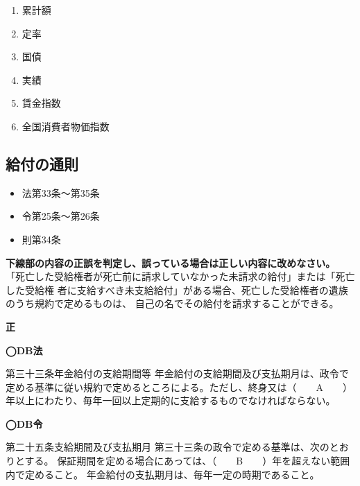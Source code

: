 \begin{answerbox}
  \begin{enumerate}[A:]
    \item 累計額
    \item 定率
    \item 国債
    \item 実績
    \item 賃金指数
    \item 全国消費者物価指数
  \end{enumerate}
\end{answerbox}

\newpage

\subsection{給付の通則}

\begin{InyouJobunbox}
  \begin{itemize}
    \item 法第33条〜第35条
    \item 令第25条〜第26条
    \item 則第34条
  \end{itemize}
\end{InyouJobunbox}

\begin{truefalse}[年金1 H28 問題2(1)\textcircled{3}]
    \textbf{下線部の内容の正誤を判定し、誤っている場合は正しい内容に改めなさい。}
  \\

   「死亡した受給権者が死亡前に請求していなかった未請求の給付」または「死亡した受給権
者に支給すべき未支給給付」がある場合、死亡した受給権者の遺族のうち規約で定めるものは、
自己の名でその給付を請求することができる。
\end{truefalse}

\begin{answerbox}
  \textbf{正}
\end{answerbox}

\begin{fillblank}[自作 2026/10/12]
  \noindent \textbf{◯DB法}
  \begin{lawstructure}
    \begin{lawarticle}{第三十三条}{年金給付の支給期間等}
      年金給付の支給期間及び支払期月は、政令で定める基準に従い規約で定めるところによる。ただし、終身又は（　　A　　）年以上にわたり、毎年一回以上定期的に支給するものでなければならない。
    \end{lawarticle}
  \end{lawstructure}

  \noindent \textbf{◯DB令}
  \begin{lawstructure}
    \begin{lawarticle}{第二十五条}{支給期間及び支払期月}
      第三十三条の政令で定める基準は、次のとおりとする。
 保証期間を定める場合にあっては、（　　B　　）年を超えない範囲内で定めること。
 年金給付の支払期月は、毎年一定の時期であること。

    \end{lawarticle}
  \end{lawstructure}
\end{fillblank}

